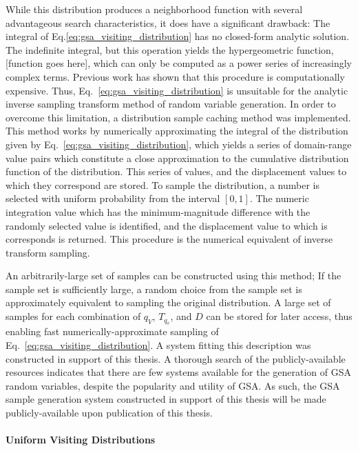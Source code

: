 \documentclass[11pt]{afthesis}
\begin{document}
	While this distribution produces a neighborhood function with several advantageous search characteristics, it does have a significant drawback:  The integral of Eq.\ref{eq:gsa_visiting_distribution} has no closed-form analytic solution. The indefinite integral, but this operation yields the hypergeometric function, [function goes here], which can only be computed as a power series of increasingly complex terms. Previous work \cite{dallinga2004performancegsa} has shown that this procedure is computationally expensive. Thus, Eq.~\ref{eq:gsa_visiting_distribution} is unsuitable for the analytic inverse sampling transform method of random variable generation. In order to overcome this limitation, a distribution sample caching method was implemented. This method works by numerically approximating the integral of the distribution given by Eq.~\ref{eq:gsa_visiting_distribution}, which yields a series of domain-range value pairs which constitute a close approximation to the cumulative distribution function of the distribution. This series of values, and the displacement values to which they correspond are stored. To sample the distribution, a number is selected with uniform probability from the interval $[0,1]$. The numeric integration value which has the minimum-magnitude difference with the randomly selected value is identified, and the displacement value to which is corresponds is returned. This procedure is the numerical equivalent of inverse transform sampling. 
	
	An arbitrarily-large set of samples can be constructed using this method; If the sample set is sufficiently large, a random choice from the sample set is approximately equivalent to sampling the original distribution. A large set of samples for each combination of $q_V$, $T_{q_v}$, and $D$ can be stored for later access, thus enabling fast numerically-approximate sampling of Eq.~\ref{eq:gsa_visiting_distribution}. A system fitting this description was constructed in support of this thesis. A thorough search of the publicly-available resources indicates that there are few systems available for the generation of GSA random variables, despite the popularity and utility of GSA. As such, the GSA sample generation system constructed in support of this thesis will be made publicly-available upon publication of this thesis.
	
	
	\paragraph{Uniform Visiting Distributions}
	
\end{document}
